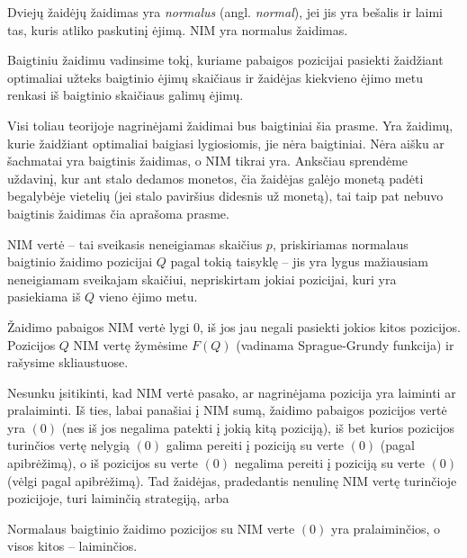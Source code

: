\begin{api}
  Dviejų žaidėjų žaidimas yra \emph{normalus} (angl. \emph{normal}), jei jis yra bešalis ir laimi
  tas, kuris atliko paskutinį ėjimą. NIM yra normalus žaidimas.
\end{api}

\begin{api}
  Baigtiniu žaidimu vadinsime tokį, kuriame pabaigos pozicijai pasiekti
  žaidžiant optimaliai užteks baigtinio ėjimų skaičiaus ir žaidėjas
  kiekvieno ėjimo metu renkasi iš baigtinio skaičiaus galimų ėjimų.
\end{api}

Visi toliau teorijoje nagrinėjami žaidimai bus baigtiniai šia prasme. Yra
žaidimų, kurie žaidžiant optimaliai baigiasi lygiosiomis, jie nėra
baigtiniai. Nėra aišku ar šachmatai yra baigtinis žaidimas, o NIM tikrai
yra. Anksčiau sprendėme uždavinį, kur ant stalo dedamos monetos, čia
žaidėjas galėjo monetą padėti begalybėje vietelių (jei stalo paviršius
didesnis už monetą), tai taip pat nebuvo baigtinis žaidimas čia aprašoma
prasme.

\begin{api}
  NIM vertė -- tai sveikasis neneigiamas skaičius $p$, priskiriamas
  normalaus baigtinio žaidimo pozicijai $Q$ pagal tokią taisyklę -- jis yra
  lygus mažiausiam neneigiamam sveikajam skaičiui, nepriskirtam jokiai
  pozicijai, kuri yra pasiekiama iš $Q$ vieno ėjimo metu. 
  
  Žaidimo pabaigos NIM vertė lygi $0$, iš jos jau negali pasiekti jokios
  kitos pozicijos. Pozicijos $Q$ NIM vertę žymėsime $F(Q)$ (vadinama
  Sprague-Grundy funkcija) ir rašysime skliaustuose.
\end{api}   

Nesunku įsitikinti, kad NIM vertė pasako, ar nagrinėjama pozicija yra
laiminti ar pralaiminti. Iš ties, labai panašiai į NIM sumą, žaidimo
pabaigos pozicijos vertė yra $(0)$ (nes iš jos negalima patekti į jokią
kitą poziciją), iš bet kurios pozicijos turinčios vertę nelygią $(0)$
galima pereiti į poziciją su verte $(0)$ (pagal apibrėžimą), o iš pozicijos
su verte $(0)$ negalima pereiti į poziciją su verte $(0)$ (vėlgi pagal
apibrėžimą). Tad žaidėjas, pradedantis nenulinę NIM vertę turinčioje
pozicijoje, turi laiminčią strategiją, arba

\begin{thm}
  Normalaus baigtinio žaidimo pozicijos su NIM verte $(0)$ yra
  pralaiminčios, o visos kitos -- laiminčios.
\end{thm}

